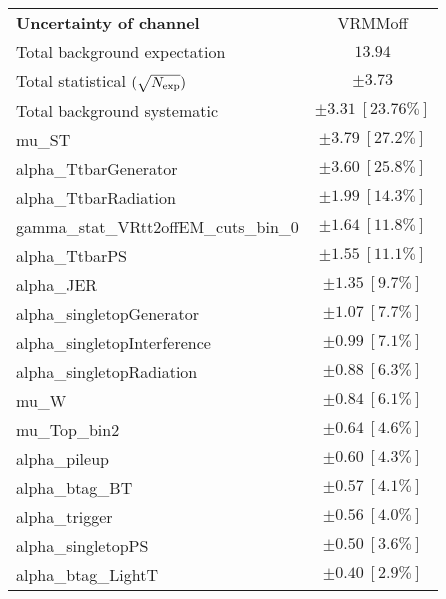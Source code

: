 
\begin{table}
\begin{center}
\setlength{\tabcolsep}{0.0pc}
\begin{tabular*}{\textwidth}{@{\extracolsep{\fill}}lc}
\noalign{\smallskip}\hline\noalign{\smallskip}
{\bf Uncertainty of channel}                                    & VRMMoff         \\
\noalign{\smallskip}\hline\noalign{\smallskip}
Total background expectation             &  $13.94$       \\
\noalign{\smallskip}\hline\noalign{\smallskip}
Total statistical $(\sqrt{N_{\rm exp}})$              & $\pm 3.73$       \\
Total background systematic               & $\pm 3.31\ [23.76\%] $             \\
\noalign{\smallskip}\hline\noalign{\smallskip}
\noalign{\smallskip}\hline\noalign{\smallskip}
mu\_ST         & $\pm 3.79\ [27.2\%] $       \\
alpha\_TtbarGenerator         & $\pm 3.60\ [25.8\%] $       \\
alpha\_TtbarRadiation         & $\pm 1.99\ [14.3\%] $       \\
gamma\_stat\_VRtt2offEM\_cuts\_bin\_0         & $\pm 1.64\ [11.8\%] $       \\
alpha\_TtbarPS         & $\pm 1.55\ [11.1\%] $       \\
alpha\_JER         & $\pm 1.35\ [9.7\%] $       \\
alpha\_singletopGenerator         & $\pm 1.07\ [7.7\%] $       \\
alpha\_singletopInterference         & $\pm 0.99\ [7.1\%] $       \\
alpha\_singletopRadiation         & $\pm 0.88\ [6.3\%] $       \\
mu\_W         & $\pm 0.84\ [6.1\%] $       \\
mu\_Top\_bin2         & $\pm 0.64\ [4.6\%] $       \\
alpha\_pileup         & $\pm 0.60\ [4.3\%] $       \\
alpha\_btag\_BT         & $\pm 0.57\ [4.1\%] $       \\
alpha\_trigger         & $\pm 0.56\ [4.0\%] $       \\
alpha\_singletopPS         & $\pm 0.50\ [3.6\%] $       \\
alpha\_btag\_LightT         & $\pm 0.40\ [2.9\%] $       \\

\end{tabular*}
\end{center}
\end{table}
